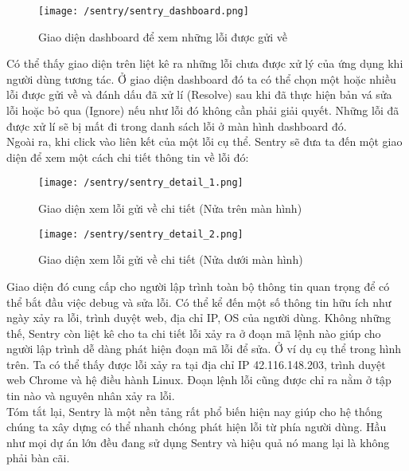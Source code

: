 			 	\begin{figure}[H]
			 		\texttt{[image: /sentry/sentry\_dashboard.png]}
			 		\centering
			 		\caption{Giao diện dashboard để xem những lỗi được gửi về}
			 	\end{figure}
		 	
		 		Có thể thấy giao diện trên liệt kê ra những lỗi chưa được xử lý của ứng dụng khi người dùng tương tác. Ở giao diện dashboard đó ta có thể chọn một hoặc nhiều lỗi được gửi về và đánh dấu đã xử lí (Resolve) sau khi đã thực hiện bản vá sửa lỗi hoặc bỏ qua (Ignore) nếu như lỗi đó không cần phải giải quyết. Những lỗi đã được xử lí sẽ bị mất đi trong danh sách lỗi ở màn hình dashboard đó. \\
		 		
		 		Ngoài ra, khi click vào liên kết của một lỗi cụ thể. Sentry sẽ đưa ta đến một giao diện để xem một cách chi tiết thông tin về lỗi đó:
		 		
			 	\begin{figure}[H]
			 		\texttt{[image: /sentry/sentry\_detail\_1.png]}
			 		\centering
			 		\caption{Giao diện xem lỗi gửi về chi tiết (Nửa trên màn hình)}
			 	\end{figure}
		 	
		 		\begin{figure}[H]
		 			\texttt{[image: /sentry/sentry\_detail\_2.png]}
		 			\centering
		 			\caption{Giao diện xem lỗi gửi về chi tiết (Nửa dưới màn hình)}
		 		\end{figure}
			 	
			 	Giao diện đó cung cấp cho người lập trình toàn bộ thông tin quan trọng để có thể bắt đầu việc debug và sửa lỗi. Có thể kể đến một số thông tin hữu ích như ngày xảy ra lỗi, trình duyệt web, địa chỉ IP, OS của người dùng. Không những thế, Sentry còn liệt kê cho ta chi tiết lỗi xảy ra ở đoạn mã lệnh nào giúp cho người lập trình dễ dàng phát hiện đoạn mã lỗi để sửa. Ở ví dụ cụ thể trong hình trên. Ta có thể thấy được lỗi xảy ra tại địa chỉ IP 42.116.148.203, trình duyệt web Chrome và hệ điều hành Linux. Đoạn lệnh lỗi cũng được chỉ ra nằm ở tập tin nào và nguyên nhân xảy ra lỗi. \\
			 	
			 	Tóm tắt lại, Sentry là một nền tảng rất phổ biến hiện nay giúp cho hệ thống chúng ta xây dựng có thể nhanh chóng phát hiện lỗi từ phía người dùng. Hầu như mọi dự án lớn đều đang sử dụng Sentry và hiệu quả nó mang lại là không phải bàn cãi.
			 	
